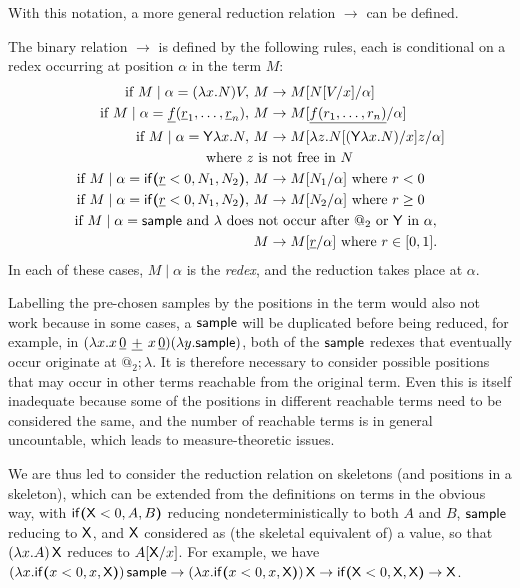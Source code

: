 With this notation, a more general reduction relation $\to$ can be defined.
\begin{definition}
\label{def:more general red}
The binary relation $\to$ is defined by the following rules, each is conditional on a redex occurring at position $\alpha$ in the term $M$:
\begin{align*}
  \text{if } M \mid \alpha = (\lambda x.N) V,\ & M \to M[N[V/x]/\alpha] \\
  \text{if } M \mid \alpha = \underline f (\underline r_1, \dots , \underline r_n),\ & M \to M[\underline{f(r_1,\dots,r_n)}/\alpha] \\
  \text{if } M \mid \alpha = \mathsf{Y} \lambda x. N,\ & M \to M[\lambda z. N[(\mathsf{Y} \lambda x. N)/x] z/\alpha]\\ \text{where }z&\text{ is not free in $N$}\\
  \text{if } M \mid \alpha = \mathsf{if}\boldsymbol{(}\underline r < 0, N_1, N_2\boldsymbol{)},\ & M \to M[N_1/\alpha] \text{ where }r < 0 \\
  \text{if } M \mid \alpha = \mathsf{if}\boldsymbol{(}\underline r < 0, N_1, N_2\boldsymbol{)},\ & M \to M[N_2/\alpha] \text{ where }r \geq 0 \\
  \text{if } M \mid \alpha = \mathsf{sample} \text{ and $\lambda$ does}&\text{ not occur after $@_2$ or $\mathsf{Y}$ in $\alpha$},\\ & M \to M[\underline r/\alpha] \text{ where } r \in [0,1].
\end{align*}
In each of these cases, $M \mid \alpha$ is the \emph{redex}, and the reduction takes place at $\alpha$.
\end{definition}

\medskip
Labelling the pre-chosen samples by the positions in the term would also not work because in some cases, a $\mathsf{sample}$ will be duplicated before being reduced, for example, in $(\lambda x. x \, {\underline 0} \, \mathbin{\underline{+}} \, {x \, \underline 0}) (\lambda y. \mathsf{sample})$, both of the $\mathsf{sample}$ redexes that eventually occur originate at $@_2 ; \lambda$. 
It is therefore necessary to consider possible positions that may occur in other terms reachable from the original term. 
Even this is itself inadequate because some of the positions in different reachable terms need to be considered the same, and the number of reachable terms is in general uncountable, which leads to measure-theoretic issues.

We are thus led to consider the reduction relation on skeletons (and positions in a skeleton), which can be extended from the definitions on terms in the obvious way, with $\mathsf{if}\boldsymbol{(}\mathsf{X} < 0, A, B\boldsymbol{)}$ reducing nondeterministically to both $A$ and $B$, $\mathsf{sample}$ reducing to $\mathsf{X}$, and $\mathsf{X}$ considered as (the skeletal equivalent of) a value, so that $(\lambda x.A) \, \mathsf{X}$ reduces to $A[\mathsf{X} / x]$.
For example, we have 
\(
(\lambda x . \mathsf{if}\boldsymbol{(}x < 0, x, \mathsf{X}\boldsymbol{)}) \, \mathsf{sample}
\to
(\lambda x . \mathsf{if}\boldsymbol{(}x < 0, x, \mathsf{X}\boldsymbol{)}) \, \mathsf{X}
\to
\mathsf{if}\boldsymbol{(}\mathsf{X} < 0, \mathsf{X}, \mathsf{X}\boldsymbol{)}
\to
\mathsf{X}
\).

